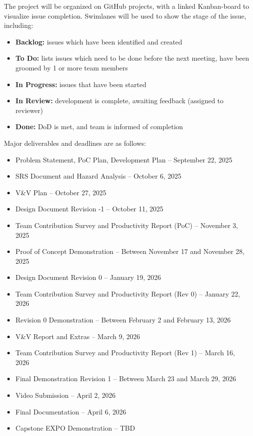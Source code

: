 \documentclass{article}
\begin{document}
The project will be organized on GitHub projects, with a linked Kanban-board to visualize issue completion. Swimlanes will be used to show the stage of the issue, including:

\begin{itemize}
    \item \textbf{Backlog:} issues which have been identified and created
    \item \textbf{To Do:} lists issues which need to be done before the next meeting, have been groomed by 1 or more team members
    \item \textbf{In Progress:} issues that have been started
    \item \textbf{In Review:} development is complete, awaiting feedback (assigned to reviewer)
    \item \textbf{Done:} DoD is met, and team is informed of completion
\end{itemize}

Major deliverables and deadlines are as follows:

\begin{itemize}
    \item Problem Statement, PoC Plan, Development Plan – September 22, 2025
    \item SRS Document and Hazard Analysis – October 6, 2025
    \item V\&V Plan – October 27, 2025
    \item Design Document Revision -1 – October 11, 2025
    \item Team Contribution Survey and Productivity Report (PoC) – November 3, 2025
    \item Proof of Concept Demonstration – Between November 17 and November 28, 2025
    \item Design Document Revision 0 – January 19, 2026
    \item Team Contribution Survey and Productivity Report (Rev 0) – January 22, 2026
    \item Revision 0 Demonstration – Between February 2 and February 13, 2026
    \item V\&V Report and Extras – March 9, 2026
    \item Team Contribution Survey and Productivity Report (Rev 1) – March 16, 2026
    \item Final Demonstration Revision 1 – Between March 23 and March 29, 2026
    \item Video Submission – April 2, 2026
    \item Final Documentation – April 6, 2026
    \item Capstone EXPO Demonstration – TBD
\end{itemize}
\end{document}
